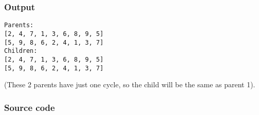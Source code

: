 \subsubsection{Output}
\begin{verbatim}
Parents:
[2, 4, 7, 1, 3, 6, 8, 9, 5]
[5, 9, 8, 6, 2, 4, 1, 3, 7]
Children:
[2, 4, 7, 1, 3, 6, 8, 9, 5]
[5, 9, 8, 6, 2, 4, 1, 3, 7]
\end{verbatim}
(These 2 parents have just one cycle, so the child will be the same as parent 1).
\subsubsection{Source code}
\inputminted{Python}{cycle.py}



